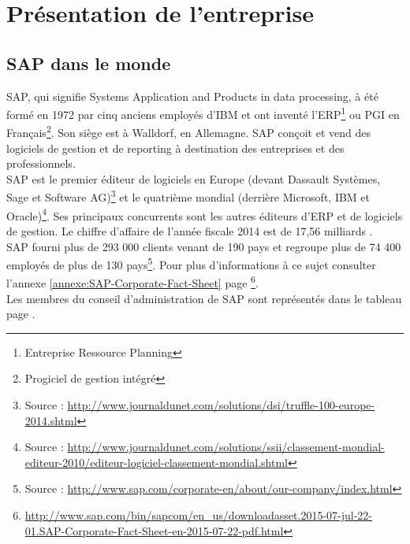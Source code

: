 \chapter{Pr\'{e}sentation de l'entreprise}
\section{SAP dans le monde}

SAP, qui signifie Systems Application and Products in data processing, à été formé en 1972 par cinq anciens employés d'IBM et ont inventé l'ERP\footnote{Entreprise Ressource Planning} ou PGI en Français\footnote{Progiciel de gestion intégré}. Son siège est à Walldorf, en Allemagne. SAP conçoit et vend des logiciels de gestion et de reporting à destination des entreprises et des professionnels.\\

SAP est le premier éditeur de logiciels en Europe (devant Dassault Systèmes, Sage et Software AG)\footnote{Source : \url{http://www.journaldunet.com/solutions/dsi/truffle-100-europe-2014.shtml}} et le quatrième mondial (derrière Microsoft, IBM et Oracle)\footnote{Source : \url{http://www.journaldunet.com/solutions/ssii/classement-mondial-editeur-2010/editeur-logiciel-classement-mondial.shtml}}. Ses principaux concurrents sont les autres éditeurs d'ERP et de logiciels de gestion. Le chiffre d'affaire de l'année fiscale 2014 est de 17,56 milliards \texteuro.\\

SAP fourni plus de 293 000 clients venant de 190 pays et regroupe plus de 74 400 employés de plus de 130 pays\footnote{Source : \url{http://www.sap.com/corporate-en/about/our-company/index.html}}. Pour plus d'informations à ce sujet consulter l'annexe \ref{annexe:SAP-Corporate-Fact-Sheet} page \pageref{annexe:SAP-Corporate-Fact-Sheet}\footnote{\url{http://www.sap.com/bin/sapcom/en_us/downloadasset.2015-07-jul-22-01.SAP-Corporate-Fact-Sheet-en-2015-07-22-pdf.html}}.\\
Les membres du conseil d'administration de SAP sont représentés dans le tableau page \pageref{table:board}.\\



